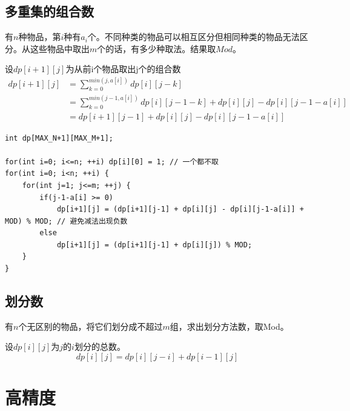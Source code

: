 \documentclass[a4paper]{ctexrep}
\begin{document}
\subsection{多重集的组合数}
有$n$种物品，第$i$种有$a_i$个。不同种类的物品可以相互区分但相同种类的物品无法区分。从这些物品中取出$m$个的话，有多少种取法。结果取$Mod$。

设$dp[i+1][j]$为从前i个物品取出j个的组合数
$$
\begin{aligned}
dp[i+1][j] &= \sum_{k=0}^{min(j, a[i])} dp[i][j-k] \\
&=\sum_{k=0}^{min(j-1, a[i])} dp[i][j-1-k] + dp[i][j] - dp[i][j-1-a[i]] \\
&=dp[i+1][j-1] + dp[i][j] - dp[i][j-1-a[i]]
\end{aligned}
$$

\begin{lstlisting}
int dp[MAX_N+1][MAX_M+1];

for(int i=0; i<=n; ++i) dp[i][0] = 1; // 一个都不取
for(int i=0; i<n; ++i) {
	for(int j=1; j<=m; ++j) {
		if(j-1-a[i] >= 0)
			dp[i+1][j] = (dp[i+1][j-1] + dp[i][j] - dp[i][j-1-a[i]] + MOD) % MOD; // 避免减法出现负数
		else
			dp[i+1][j] = (dp[i+1][j-1] + dp[i][j]) % MOD;
	}
}
\end{lstlisting}

\subsection{划分数}
有$n$个无区别的物品，将它们划分成不超过$m$组，求出划分方法数，取Mod。

设$dp[i][j]$为$j$的$i$划分的总数。
$$dp[i][j] = dp[i][j-i]+dp[i-1][j]$$



\section{高精度}
\end{document}
